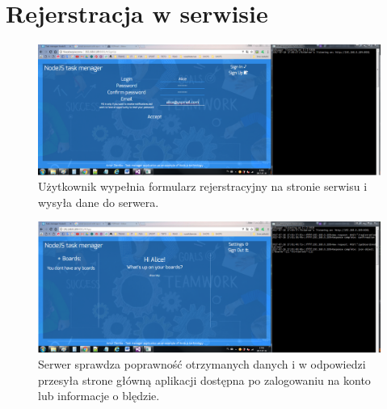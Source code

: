 \documentclass[12pt]{report}
\begin{document}
\section{Rejerstracja w serwisie}
\begin{figure}[!hb]
\centering
\includegraphics[width=\textwidth,height=\textheight,keepaspectratio]{21.png}
\captionsetup{labelformat=empty}
\caption[]{Użytkownik wypełnia formularz rejerstracyjny na stronie serwisu i wysyła dane do serwera. }
\end{figure}
\begin{figure}[!hb]
\centering
\includegraphics[width=\textwidth,height=\textheight,keepaspectratio]{22.png}
\captionsetup{labelformat=empty}
\caption[]{Serwer sprawdza poprawność otrzymanych danych i w odpowiedzi przesyła strone główną aplikacji dostępna po zalogowaniu na konto lub informacje o blędzie.}
\end{figure}
\end{document}
